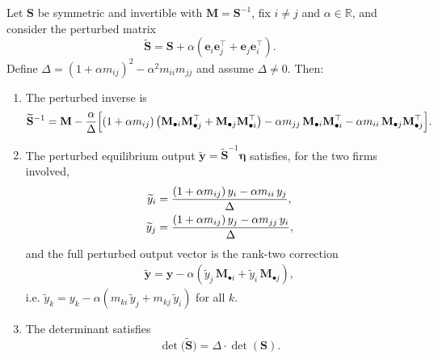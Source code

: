 \begin{lemma}
Let $\mathbf{S}$ be symmetric and invertible with
$\mathbf{M} = \mathbf{S}^{-1}$, fix $i \neq j$ and $\alpha \in
\mathbb{R}$, and consider the perturbed matrix
\[
\widetilde{\mathbf{S}}
=
\mathbf{S}
+ \alpha \left( \mathbf{e}_i \mathbf{e}_j^\top
+ \mathbf{e}_j \mathbf{e}_i^\top \right).
\]
Define
$\Delta = (1 + \alpha m_{ij})^2 - \alpha^2 m_{ii} m_{jj}$
and assume $\Delta \neq 0$. Then:
\begin{enumerate}
\item[(i)] The perturbed inverse is
\begin{equation}
\widetilde{\mathbf{S}}^{-1}
=
\mathbf{M}
- \frac{\alpha}{\Delta}
\Bigl[
(1 + \alpha m_{ij})
\left( \mathbf{M}_{\bullet i} \mathbf{M}_{\bullet j}^\top
+ \mathbf{M}_{\bullet j} \mathbf{M}_{\bullet i}^\top \right)
- \alpha m_{jj}\, \mathbf{M}_{\bullet i} \mathbf{M}_{\bullet i}^\top
- \alpha m_{ii}\, \mathbf{M}_{\bullet j} \mathbf{M}_{\bullet j}^\top
\Bigr].
\label{eq:B-inv-2}
\end{equation}
\item[(ii)] The perturbed equilibrium output
$\widetilde{\mathbf{y}} = \widetilde{\mathbf{S}}^{-1} \bm{\eta}$
satisfies, for the two firms involved,
\begin{align}
\widetilde{y}_i
& =
\frac{(1 + \alpha m_{ij})\, y_i - \alpha m_{ii}\, y_j}{\Delta},
\notag \\
\widetilde{y}_j
& =
\frac{(1 + \alpha m_{ij})\, y_j - \alpha m_{jj}\, y_i}{\Delta},
\label{eq:link-update-outputs}
\end{align}
and the full perturbed output vector is the rank-two correction
\begin{align}
\widetilde{\mathbf{y}}
=
\mathbf{y}
- \alpha
\left(
\widetilde{y}_j\, \mathbf{M}_{\bullet i}
+ \widetilde{y}_i\, \mathbf{M}_{\bullet j}
\right),
\label{eq:link-update-fullvector}
\end{align}
i.e. $
\widetilde{y}_k
=
y_k
- \alpha
\left( m_{ki}\, \widetilde{y}_j + m_{kj}\, \widetilde{y}_i \right)$ for all $k$.
\item[(iii)] The determinant satisfies
\begin{equation}
\det \bigl( \widetilde{\mathbf{S}} \bigr)
=
\Delta \cdot \det ( \mathbf{S} ).
\label{eq:link-update-det}
\end{equation}
\end{enumerate}
\label{lem:matrix-perturbation-inv}
\label{lem:woodbury-link-update}
\end{lemma}

